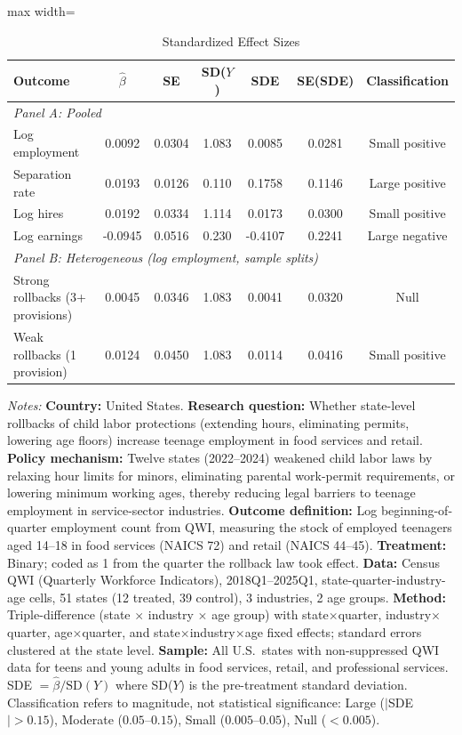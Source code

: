 \begin{table}[htbp]
\centering
\caption{Standardized Effect Sizes}
\label{tab:sde}
\begin{adjustbox}{max width=\textwidth}
\begin{tabular}{lcccccc}
\toprule
Outcome & $\hat{\beta}$ & SE & SD($Y$) & SDE & SE(SDE) & Classification \\
\midrule
\multicolumn{7}{l}{\textit{Panel A: Pooled}} \\
Log employment & 0.0092 & 0.0304 & 1.083 & 0.0085 & 0.0281 & Small positive \\
Separation rate & 0.0193 & 0.0126 & 0.110 & 0.1758 & 0.1146 & Large positive \\
Log hires & 0.0192 & 0.0334 & 1.114 & 0.0173 & 0.0300 & Small positive \\
Log earnings & -0.0945 & 0.0516 & 0.230 & -0.4107 & 0.2241 & Large negative \\
\midrule
\multicolumn{7}{l}{\textit{Panel B: Heterogeneous (log employment, sample splits)}} \\
Strong rollbacks (3+ provisions) & 0.0045 & 0.0346 & 1.083 & 0.0041 & 0.0320 & Null \\
Weak rollbacks (1 provision) & 0.0124 & 0.0450 & 1.083 & 0.0114 & 0.0416 & Small positive \\
\bottomrule
\end{tabular}
\end{adjustbox}

\vspace{0.5em}
\begin{minipage}{\textwidth}
\footnotesize
\textit{Notes:} \textbf{Country:} United States. \textbf{Research question:} Whether state-level rollbacks of child labor protections (extending hours, eliminating permits, lowering age floors) increase teenage employment in food services and retail. \textbf{Policy mechanism:} Twelve states (2022--2024) weakened child labor laws by relaxing hour limits for minors, eliminating parental work-permit requirements, or lowering minimum working ages, thereby reducing legal barriers to teenage employment in service-sector industries. \textbf{Outcome definition:} Log beginning-of-quarter employment count from QWI, measuring the stock of employed teenagers aged 14--18 in food services (NAICS 72) and retail (NAICS 44--45). \textbf{Treatment:} Binary; coded as 1 from the quarter the rollback law took effect. \textbf{Data:} Census QWI (Quarterly Workforce Indicators), 2018Q1--2025Q1, state-quarter-industry-age cells, 51 states (12 treated, 39 control), 3 industries, 2 age groups. \textbf{Method:} Triple-difference (state $\times$ industry $\times$ age group) with state$\times$quarter, industry$\times$quarter, age$\times$quarter, and state$\times$industry$\times$age fixed effects; standard errors clustered at the state level. \textbf{Sample:} All U.S.\ states with non-suppressed QWI data for teens and young adults in food services, retail, and professional services. SDE $= \hat{\beta} / \text{SD}(Y)$ where SD($Y$) is the pre-treatment standard deviation. Classification refers to magnitude, not statistical significance: Large ($|$SDE$| > 0.15$), Moderate ($0.05$--$0.15$), Small ($0.005$--$0.05$), Null ($< 0.005$).
\end{minipage}
\end{table}
